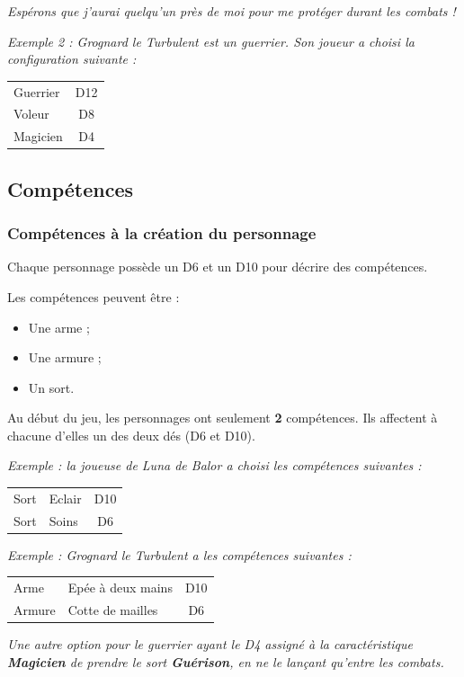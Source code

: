 \documentclass[a4paper, 11pt, twoside]{article}
\begin{document}
\emph{Espérons que j'aurai quelqu'un près de moi pour me protéger durant les combats !}

\emph{Exemple 2 : Grognard le Turbulent est un guerrier. Son joueur a choisi la configuration suivante :}

\begin{longtable}{lc}
Guerrier & D12\\
Voleur & D8\\
Magicien & D4\\
\end{longtable}


\subsection{Compétences}
\label{sec:org52c7a9b}
\subsubsection{Compétences à la création du personnage}
\label{sec:org1e266b9}

Chaque personnage possède un D6 et un D10 pour décrire des compétences.

Les compétences peuvent être :
\begin{itemize}
\item Une arme ;
\item Une armure ;
\item Un sort.
\end{itemize}

Au début du jeu, les personnages ont seulement \textbf{2} compétences. Ils affectent à chacune d'elles un des deux dés (D6 et D10).

\emph{Exemple : la joueuse de Luna de Balor a choisi les compétences suivantes :}

\begin{longtable}{llc}
Sort & Eclair & D10\\
Sort & Soins & D6\\
\end{longtable}

\emph{Exemple : Grognard le Turbulent a les compétences suivantes :}

\begin{longtable}{llc}
Arme & Epée à deux mains & D10\\
Armure & Cotte de mailles & D6\\
\end{longtable}

\emph{Une autre option pour le guerrier ayant le D4 assigné à la caractéristique \textbf{Magicien} de prendre le sort \textbf{Guérison}, en ne le lançant qu'entre les combats.}
\end{document}
